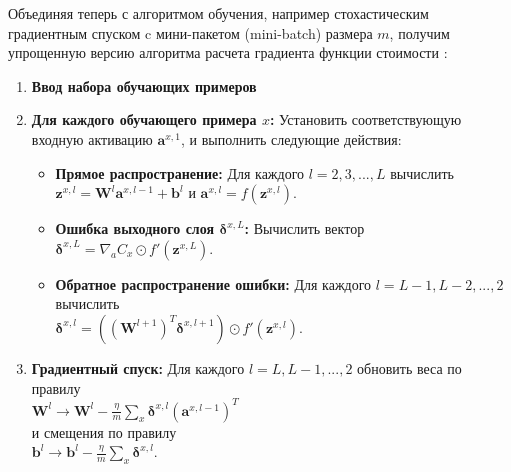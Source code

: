 Объединяя теперь с алгоритмом обучения, например стохастическим градиентным 
спуском c мини-пакетом (mini-batch) размера $m$, получим упрощенную версию 
алгоритма расчета градиента функции стоимости \cite{NN_Nielsen}:
\begin{enumerate}
    \item \textbf{Ввод набора обучающих примеров}
    \item \textbf{Для каждого обучающего примера $x$:} Установить соответствующую входную активацию $\bm{a}^{x,1}$, и выполнить следующие действия:
    \begin{itemize}
        \item \textbf{Прямое распространение:} Для каждого $l=2,3,...,L$ вычислить \\$\bm{z}^{x,l}=\bm{W}^l \bm{a}^{x,l-1} + \bm{b}^l$ и $\bm{a}^{x,l} = f(\bm{z}^{x,l})$. 
        \item \textbf{Ошибка выходного слоя $\bm{\delta}^{x,L}$:} Вычислить вектор\\ $\bm{\delta}^{x,L}=\nabla_a C_x \odot f'(\bm{z}^{x,L})$.
        \item \textbf{Обратное распространение ошибки:} Для каждого $l=L-1, L-2, ..., 2$ вычислить \\$\bm{\delta}^{x,l}=((\bm{W}^{l+1})^T \bm{\delta}^{x,l+1}) \odot f'(\bm{z}^{x,l})$.
    \end{itemize}
    \item \textbf{Градиентный спуск:} Для каждого $l=L,L-1,...,2$ обновить веса по правилу\\$\bm{W}^l \rightarrow \bm{W}^l - \frac{\eta}{m} \sum_x \bm{\delta}^{x,l} (\bm{a}^{x,l-1})^T$\\и смещения по правилу\\$\bm{b}^l \rightarrow \bm{b}^l - \frac{\eta}{m} \sum_x \bm{\delta}^{x,l}$.
\end{enumerate}




